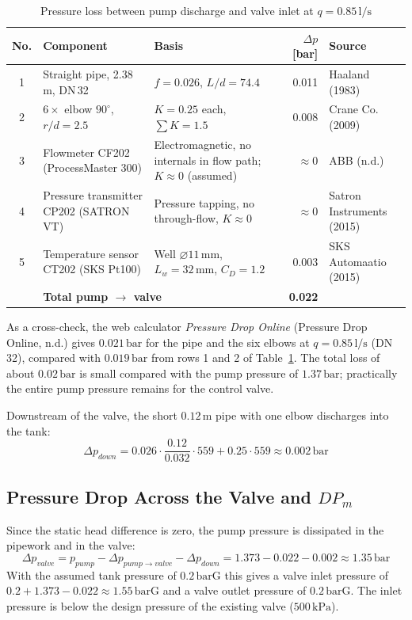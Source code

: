 \documentclass[11pt,a4paper]{article}
\begin{document}
\begin{table}[H]
\centering
\caption{Pressure loss between pump discharge and valve inlet at $q = 0.85\,\text{l/s}$}
\label{tab:loss}
\small
\begin{tabularx}{\textwidth}{@{}cp{3.6cm}Xrp{2.6cm}@{}}
\toprule
No. & Component & Basis & $\Delta p$ [bar] & Source \\
\midrule
1 & Straight pipe, 2.38\,m, DN\,32 & $f = 0.026$, $L/d = 74.4$ & 0.011 & Haaland (1983) \\
2 & $6\times$ elbow $90^\circ$, $r/d = 2.5$ & $K = 0.25$ each, $\sum K = 1.5$ & 0.008 & Crane Co. (2009) \\
3 & Flowmeter CF202 (ProcessMaster 300) & Electromagnetic, no internals in flow path; $K \approx 0$ (assumed) & $\approx 0$ & ABB (n.d.) \\
4 & Pressure transmitter CP202 (SATRON VT) & Pressure tapping, no through-flow, $K \approx 0$ & $\approx 0$ & Satron Instruments (2015) \\
5 & Temperature sensor CT202 (SKS Pt100) & Well $\varnothing 11\,\text{mm}$, $L_w = 32\,\text{mm}$, $C_D = 1.2$ & 0.003 & SKS Automaatio (2015) \\
\midrule
 & \multicolumn{2}{l}{\textbf{Total pump $\rightarrow$ valve}} & \textbf{0.022} & \\
\bottomrule
\end{tabularx}
\end{table}

As a cross-check, the web calculator \textit{Pressure Drop Online} (Pressure Drop Online, n.d.) gives $0.021\,\text{bar}$ for the pipe and the six elbows at $q = 0.85\,\text{l/s}$ (DN\,32), compared with $0.019\,\text{bar}$ from rows 1 and 2 of Table~\ref{tab:loss}. The total loss of about $0.02\,\text{bar}$ is small compared with the pump pressure of $1.37\,\text{bar}$; practically the entire pump pressure remains for the control valve.

Downstream of the valve, the short $0.12\,\text{m}$ pipe with one elbow discharges into the tank:
\begin{equation}
    \Delta p_{down} = 0.026\cdot\frac{0.12}{0.032}\cdot 559 + 0.25\cdot 559 \approx 0.002\,\text{bar}
\end{equation}

\subsection{Pressure Drop Across the Valve and \texorpdfstring{$DP_m$}{DPm}}
Since the static head difference is zero, the pump pressure is dissipated in the pipework and in the valve:
\begin{equation}
    \Delta p_{valve} = p_{pump} - \Delta p_{pump\rightarrow valve} - \Delta p_{down} = 1.373 - 0.022 - 0.002 \approx 1.35\,\text{bar}
\end{equation}
With the assumed tank pressure of $0.2\,\text{barG}$ this gives a valve inlet pressure of $0.2 + 1.373 - 0.022 \approx 1.55\,\text{barG}$ and a valve outlet pressure of $0.2\,\text{barG}$. The inlet pressure is below the design pressure of the existing valve ($500\,\text{kPa}$).
\end{document}

